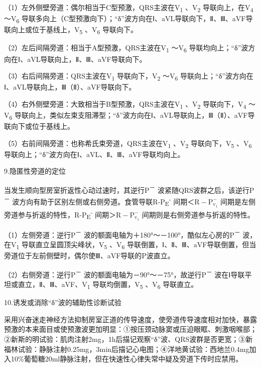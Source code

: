 （1）左外侧壁旁道：偶尔相当于C型预激，QRS主波在V\textsubscript{1}
、V\textsubscript{2} 导联向上，在V\textsubscript{4} ～V\textsubscript{6}
导联多向上（C型预激向下）；“δ”波方向在Ⅰ、aVL导联向下，Ⅱ、Ⅲ、aVF导联向上或位于基线上，V\textsubscript{5}
、V\textsubscript{6} 导联向下。

（2）左后间隔旁道：相当于A型预激，QRS主波在V\textsubscript{1}
～V\textsubscript{6}
导联均向上；“δ”波方向在Ⅰ、aVL导联向上，Ⅱ、Ⅲ、aVF导联向下。

（3）右后间隔旁道：QRS主波在V\textsubscript{1}
导联向下，V\textsubscript{2} ～V\textsubscript{6}
导联向上；“δ”波方向在Ⅰ、aVL导联向上，Ⅲ（Ⅱ）、aVF导联向下。

（4）右外侧壁旁道：大致相当于B型预激，QRS主波在V\textsubscript{1}
、V\textsubscript{2} 导联向下，V\textsubscript{4} ～V\textsubscript{6}
导联向上，类似左束支阻滞型；“δ”波方向在Ⅰ、aVL导联向上，Ⅲ（Ⅱ）、aVF导联向下或位于基线上。

（5）右前间隔旁道：也称希氏束旁道，QRS主波在V\textsubscript{1}
、V\textsubscript{2} 导联向下，V\textsubscript{5} 、V\textsubscript{6}
导联向上；“δ”波方向在Ⅰ、aVL、Ⅱ、Ⅲ、aVF导联均向上。

9.隐匿性旁道的定位

当发生顺向型房室折返性心动过速时，其逆行P\textsuperscript{－}
波紧随QRS波群之后，该逆行P\textsuperscript{－}
波方向有助于区别左侧或右侧旁道。食管导联R-P\textsubscript{E}\textsuperscript{-}
间期＜$\text{R}-\text{P}_{\text{v}_1}^-$
间期是左侧旁道参与折返的特性，R-P\textsubscript{E}\textsuperscript{-}
间期＞$\text{R}-\text{P}_{\text{v}_1}^-$
间期则是右侧旁道参与折返的特性。

（1）左侧旁道：逆行P\textsuperscript{－}
波的额面电轴为＋180°～－100°，酷似左心房的P\textsuperscript{－}
波，在V\textsubscript{1} 导联直立呈圆顶尖峰状，V\textsubscript{5}
、V\textsubscript{6}
导联倒置，Ⅰ、Ⅱ、Ⅲ、aVF导联倒置，但当旁道位于左前侧壁时，偶尔使Ⅲ、aVF导联的P波直立。

（2）右侧旁道：逆行P\textsuperscript{－}
波的额面电轴为－90°～－75°，故逆行P\textsuperscript{－}
波在Ⅰ导联平坦或直立，Ⅱ、Ⅲ、aVF、V\textsubscript{1}
导联均倒置，V\textsubscript{5} 、V\textsubscript{6} 导联直立。

10.诱发或消除“δ”波的辅助性诊断试验

采用兴奋迷走神经方法抑制房室正道的传导速度，使旁道传导速度相对加快，暴露预激的本来面目或使预激波更加明显：①按压颈动脉窦或压迫眼眶、刺激咽喉部；②新斯的明试验：肌肉注射2mg，1h后描记观察“δ”波、QRS波群是否更宽；③新福林试验：静脉注射0.25mg，3min后描记心电图；④洋地黄试验：西地兰0.4mg加入10\%葡萄糖20ml静脉注射，但在快速性心律失常中疑及旁道下传时应禁用。

